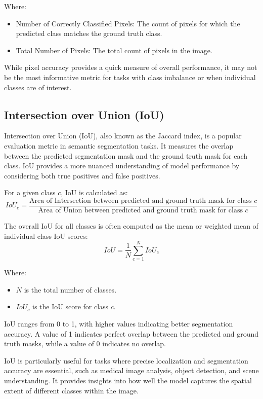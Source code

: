 Where:
\begin{itemize}
	\item Number of Correctly Classified Pixels: The count of pixels for which the predicted class matches the ground truth class.
	\item Total Number of Pixels: The total count of pixels in the image.
\end{itemize}

While pixel accuracy provides a quick measure of overall performance, it may not be the most informative metric for tasks with class imbalance or when individual classes are of interest.

\subsection*{Intersection over Union (IoU)}
Intersection over Union (IoU), also known as the Jaccard index, is a popular evaluation metric in semantic segmentation tasks. It measures the overlap between the predicted segmentation mask and the ground truth mask for each class. IoU provides a more nuanced understanding of model performance by considering both true positives and false positives.

For a given class $c$, IoU is calculated as:
\begin{equation}
	IoU_c = \frac{\text{Area of Intersection between predicted and ground truth mask for class } c}{\text{Area of Union between predicted and ground truth mask for class } c}
\end{equation}

The overall IoU for all classes is often computed as the mean or weighted mean of individual class IoU scores:
\begin{equation}
	IoU = \frac{1}{N} \sum_{c=1}^{N} IoU_c
\end{equation}

Where:
\begin{itemize}
	\item $N$ is the total number of classes.
	\item $IoU_c$ is the IoU score for class $c$.
\end{itemize}

IoU ranges from 0 to 1, with higher values indicating better segmentation accuracy. A value of 1 indicates perfect overlap between the predicted and ground truth masks, while a value of 0 indicates no overlap.

IoU is particularly useful for tasks where precise localization and segmentation accuracy are essential, such as medical image analysis, object detection, and scene understanding. It provides insights into how well the model captures the spatial extent of different classes within the image.
